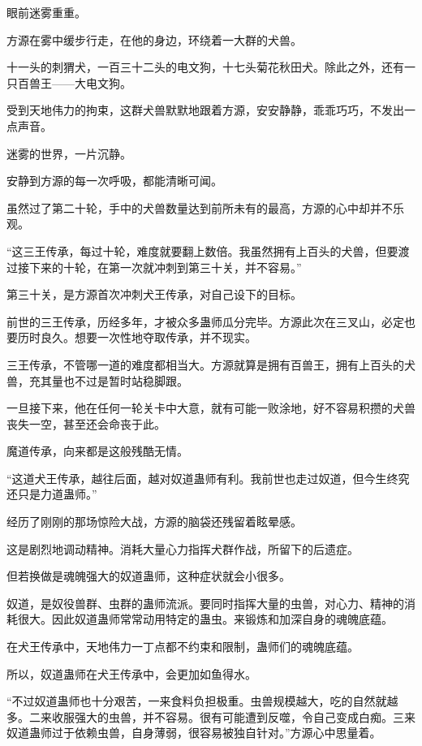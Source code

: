 
\begin{this_body}

眼前迷雾重重。

方源在雾中缓步行走，在他的身边，环绕着一大群的犬兽。

十一头的刺猬犬，一百三十二头的电文狗，十七头菊花秋田犬。除此之外，还有一只百兽王——大电文狗。

受到天地伟力的拘束，这群犬兽默默地跟着方源，安安静静，乖乖巧巧，不发出一点声音。

迷雾的世界，一片沉静。

安静到方源的每一次呼吸，都能清晰可闻。

虽然过了第二十轮，手中的犬兽数量达到前所未有的最高，方源的心中却并不乐观。

“这三王传承，每过十轮，难度就要翻上数倍。我虽然拥有上百头的犬兽，但要渡过接下来的十轮，在第一次就冲刺到第三十关，并不容易。”

第三十关，是方源首次冲刺犬王传承，对自己设下的目标。

前世的三王传承，历经多年，才被众多蛊师瓜分完毕。方源此次在三叉山，必定也要历时良久。想要一次性地夺取传承，并不现实。

三王传承，不管哪一道的难度都相当大。方源就算是拥有百兽王，拥有上百头的犬兽，充其量也不过是暂时站稳脚跟。

一旦接下来，他在任何一轮关卡中大意，就有可能一败涂地，好不容易积攒的犬兽丧失一空，甚至还会命丧于此。

魔道传承，向来都是这般残酷无情。

“这道犬王传承，越往后面，越对奴道蛊师有利。我前世也走过奴道，但今生终究还只是力道蛊师。”

经历了刚刚的那场惊险大战，方源的脑袋还残留着眩晕感。

这是剧烈地调动精神。消耗大量心力指挥犬群作战，所留下的后遗症。

但若换做是魂魄强大的奴道蛊师，这种症状就会小很多。

奴道，是奴役兽群、虫群的蛊师流派。要同时指挥大量的虫兽，对心力、精神的消耗很大。因此奴道蛊师常常动用特定的蛊虫。来锻炼和加深自身的魂魄底蕴。

在犬王传承中，天地伟力一丁点都不约束和限制，蛊师们的魂魄底蕴。

所以，奴道蛊师在犬王传承中，会更加如鱼得水。

“不过奴道蛊师也十分艰苦，一来食料负担极重。虫兽规模越大，吃的自然就越多。二来收服强大的虫兽，并不容易。很有可能遭到反噬，令自己变成白痴。三来奴道蛊师过于依赖虫兽，自身薄弱，很容易被独自针对。”方源心中思量着。


\end{this_body}
